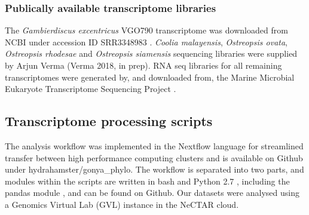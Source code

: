 \documentclass[12pt]{article}
\begin{document}
\subsubsection*{Publically available transcriptome libraries}
The \emph{Gambierdiscus excentricus} VGO790 transcriptome was downloaded from NCBI under accession ID SRR3348983 \cite{kohli2017role}. 
\textit{Coolia malayensis}, \textit{Ostreopsis ovata}, \textit{Ostreopsis rhodesae} and \textit{Ostreopsis siamensis} sequencing libraries were supplied by Arjun Verma (Verma 2018, in prep). 
RNA seq libraries for all remaining transcriptomes were generated by, and downloaded from, the Marine Microbial Eukaryote Transcriptome Sequencing Project \citep{keeling2014marine}.

\subsection*{Transcriptome processing scripts}
The analysis workflow was implemented in the Nextflow language \cite{nextflow} for streamlined transfer between high performance computing clusters and is available on Github under hydrahamster/gonya\_phylo. 
The workflow is separated into two parts, and modules within the scripts are written in bash and Python 2.7 \cite{python}, including the pandas module \cite{pandas}, and can be found on Github. 
Our datasets were analysed using a Genomics Virtual Lab (GVL) \cite{afgan2015genomics} instance in the NeCTAR cloud.
\end{document}

